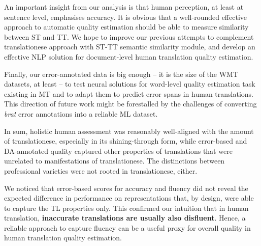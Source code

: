 An important insight from our analysis is that human perception, at least at sentence level, emphasises accuracy. It is obvious that a well-rounded effective approach to automatic quality estimation should be able to measure similarity between ST and TT. We hope to improve our previous attempts to complement translationese approach with ST-TT semantic similarity module, and develop an effective NLP solution for document-level human translation quality estimation. 

Finally, our error-annotated data is big enough -- it is the size of the WMT datasets, at least -- to test neural solutions for word-level quality estimation task existing in MT and to adapt them to predict error spans in human translations. This direction of future work might be forestalled by the challenges of converting \textit{brat} error annotations into a reliable ML dataset.    


In sum, holistic human assessment was reasonably well-aligned with the amount of translationese, especially in its shining-through form, while error-based and DA-annotated quality captured other properties of translations that were unrelated to manifestations of translationese. The distinctions between professional varieties were not rooted in translationese, either. 

We noticed that error-based scores for accuracy and fluency did not reveal the expected difference in performance on representations that, by design, were able to capture the TL properties only.
This confirmed our intuition that in human translation, \textbf{inaccurate translations are usually also disfluent}. Hence, a reliable approach to capture fluency can be a useful proxy for overall quality in human translation quality estimation.

